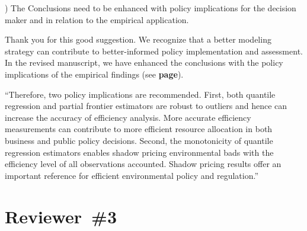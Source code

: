\documentclass[12pt]{article}
\newcommand{\np}{\vskip 0.3cm}
\begin{document}
\np
\np
\np
\begin{sf}
{) The Conclusions need to be enhanced with policy implications for the decision maker and in relation to the empirical application.}
\end{sf}
\begin{response}
Thank you for this good suggestion. We recognize that a better modeling strategy can contribute to better-informed policy implementation and assessment. In the revised manuscript, we have enhanced the conclusions with the policy implications of the empirical findings (see \textbf{page}). \np

``Therefore, two policy implications are recommended. First, both quantile regression and partial frontier estimators are robust to outliers and hence can increase the accuracy of efficiency analysis. More accurate efficiency measurements can contribute to more efficient resource allocation in both business and public policy decisions. Second, the monotonicity of quantile regression estimators enables shadow pricing environmental bads with the efficiency level of all observations accounted. Shadow pricing results offer an important reference for efficient environmental policy and regulation.''
\end{response}


\newpage
\section*{Reviewer~\#3}
\end{document}
